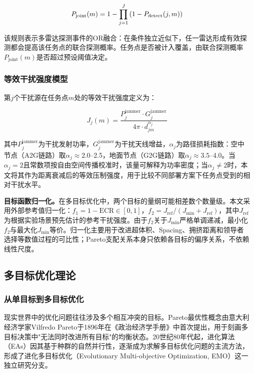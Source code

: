 \begin{equation}
P_{\text{joint}}(m) = 1 - \prod_{j=1}^{J} \left(1 - P_{\text{detect}}(j, m)\right)
\label{eq:joint_prob}
\end{equation}

该规则表示多雷达探测事件的OR融合：在条件独立近似下，任一雷达形成有效探测都会提高该任务点的联合探测概率。任务点是否被计入覆盖，由联合探测概率$P_{\text{joint}}(m)$是否超过预设阈值决定。

\subsubsection{等效干扰强度模型}

第$j$个干扰源在任务点$m$处的等效干扰强度定义为：

\begin{equation}
J_j(m) = \frac{P_j^{\text{jammer}} \cdot G_j^{\text{jammer}}}{4\pi \cdot d_{jm}^{\alpha_j}}
\label{eq:jamming}
\end{equation}

其中$P_j^{\text{jammer}}$为干扰发射功率，$G_j^{\text{jammer}}$为干扰天线增益，$\alpha_j$为路径损耗指数：空中节点（A2G链路）取$\alpha_j \approx 2.0$--2.5，地面节点（G2G链路）取$\alpha_j \approx 3.5$--4.0。当$\alpha_j=2$且常数项按自由空间传播校准时，该量可解释为功率密度；当$\alpha_j\neq 2$时，本文将其作为距离衰减后的等效压制强度，用于比较不同部署方案下任务点受到的相对干扰水平。

\textbf{目标函数归一化。}在多目标优化中，两个目标的量纲可能相差数个数量级。本文采用外部参考值归一化：$f_1 = 1 - \text{ECR} \in [0, 1]$，$f_2 = J_{\text{ref}} / (J_{\min} + J_{\text{ref}})$，其中$J_{\text{ref}}$为根据实验场景预先估计的参考干扰强度。由于$f_2$关于$J_{\min}$严格单调递减，最小化$f_2$与最大化$J_{\min}$等价。归一化主要用于改进超体积、Spacing、拥挤距离和领导者选择等数值过程的可比性；Pareto支配关系本身只依赖各目标的偏序关系，不依赖线性尺度。

\subsection{多目标优化理论}

\subsubsection{从单目标到多目标优化}

现实世界中的优化问题往往涉及多个相互冲突的目标。Pareto最优性概念由意大利经济学家Vilfredo Pareto于1896年在《政治经济学手册》中首次提出，用于刻画多目标决策中"无法同时改进所有目标"的均衡状态。20世纪80年代起，进化算法（EAs）因其基于种群的自然并行性，逐渐成为求解多目标优化问题的主流方法，形成了进化多目标优化（Evolutionary Multi-objective Optimization, EMO）这一独立研究分支。

